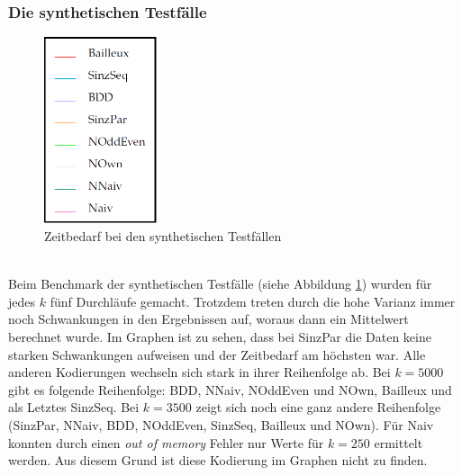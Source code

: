 \documentclass[a4,abstract=on]{scrartcl}
\begin{document}
\subsubsection*{Die synthetischen Testfälle}


\begin{figure}[htbp]
\includegraphics[width=3.3cm]{legende.png}
\caption{Zeitbedarf bei den synthetischen Testfällen}
\label{fig:synth}
\end{figure}
\ \\
Beim Benchmark der synthetischen Testfälle (siehe Abbildung \ref{fig:synth}) wurden für jedes $k$ fünf Durchläufe gemacht. Trotzdem treten durch die hohe Varianz immer noch Schwankungen in den Ergebnissen auf, woraus dann ein Mittelwert berechnet wurde. Im Graphen ist zu sehen, dass bei SinzPar die Daten keine starken Schwankungen aufweisen und der Zeitbedarf am höchsten war. Alle anderen Kodierungen wechseln sich stark in ihrer Reihenfolge ab. Bei $k=5000$ gibt es folgende Reihenfolge: BDD, NNaiv, NOddEven und NOwn, Bailleux und als Letztes SinzSeq. Bei $k=3500$ zeigt sich noch eine ganz andere Reihenfolge (SinzPar, NNaiv, BDD, NOddEven, SinzSeq, Bailleux und NOwn). Für Naiv konnten durch einen \textit{out of memory} Fehler nur Werte für $k=250$ ermittelt werden. Aus diesem Grund ist diese Kodierung im Graphen nicht zu finden.
\end{document}
